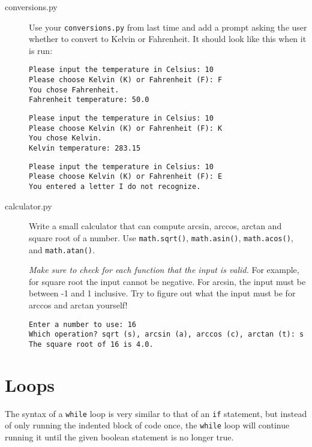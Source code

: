 \documentclass[11pt,hidelinks]{article}
\begin{document}
\begin{description}
  \item[conversions.py] Use your \texttt{conversions.py} from last time and add a
    prompt asking the user whether to convert to Kelvin or Fahrenheit. It should
    look like this when it is run:

    \begin{lstlisting}[style=bash]
Please input the temperature in Celsius: 10
Please choose Kelvin (K) or Fahrenheit (F): F
You chose Fahrenheit.
Fahrenheit temperature: 50.0
    \end{lstlisting}
    \begin{lstlisting}[style=bash]
Please input the temperature in Celsius: 10
Please choose Kelvin (K) or Fahrenheit (F): K
You chose Kelvin.
Kelvin temperature: 283.15
    \end{lstlisting}
    \begin{lstlisting}[style=bash]
Please input the temperature in Celsius: 10
Please choose Kelvin (K) or Fahrenheit (F): E
You entered a letter I do not recognize.
    \end{lstlisting}

  \item[calculator.py] Write a small calculator that can compute arcsin, arccos,
    arctan and square root of a number. Use \lstinline!math.sqrt()!,
    \lstinline!math.asin()!, \lstinline!math.acos()!, and
    \lstinline!math.atan()!.

    \emph{Make sure to check for each function that the input is valid.} For
    example, for square root the input cannot be negative. For arcsin, the input
    must be between -1 and 1 inclusive. Try to figure out what the input must be
    for arccos and arctan yourself!

    \begin{lstlisting}[style=bash]
Enter a number to use: 16
Which operation? sqrt (s), arcsin (a), arccos (c), arctan (t): s
The square root of 16 is 4.0.
    \end{lstlisting}

\end{description}

\pagebreak
\section{Loops}
The syntax of a \lstinline{while} loop is very similar to that of an
\lstinline{if} statement, but instead of only running the indented block of code
once, the \lstinline{while} loop will continue running it until the given
boolean statement is no longer true.
\end{document}
